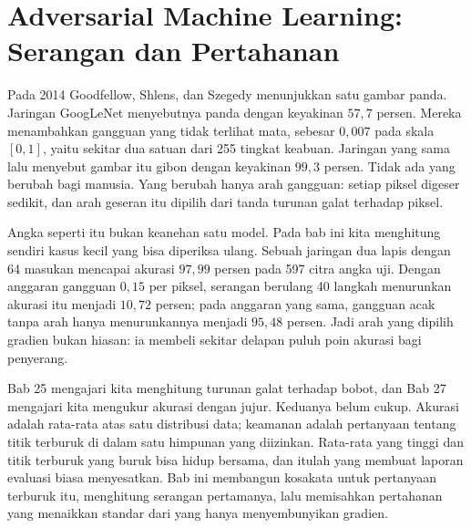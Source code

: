 \chapter[Adversarial Machine Learning]{Adversarial Machine Learning: Serangan dan Pertahanan}

Pada 2014 Goodfellow, Shlens, dan Szegedy menunjukkan satu gambar panda. Jaringan
GoogLeNet menyebutnya panda dengan keyakinan $57{,}7$ persen. Mereka menambahkan
gangguan yang tidak terlihat mata, sebesar $0{,}007$ pada skala $[0,1]$, yaitu sekitar
dua satuan dari 255 tingkat keabuan. Jaringan yang sama lalu menyebut gambar itu gibon
dengan keyakinan $99{,}3$ persen. Tidak ada yang berubah bagi manusia. Yang berubah
hanya arah gangguan: setiap piksel digeser sedikit, dan arah geseran itu dipilih dari
tanda turunan galat terhadap piksel.

Angka seperti itu bukan keanehan satu model. Pada bab ini kita menghitung sendiri
kasus kecil yang bisa diperiksa ulang. Sebuah jaringan dua lapis dengan 64 masukan
mencapai akurasi $97{,}99$ persen pada 597 citra angka uji. Dengan anggaran gangguan
$0{,}15$ per piksel, serangan berulang 40 langkah menurunkan akurasi itu menjadi
$10{,}72$ persen; pada anggaran yang sama, gangguan acak tanpa arah hanya
menurunkannya menjadi $95{,}48$ persen. Jadi arah yang dipilih gradien bukan hiasan:
ia membeli sekitar delapan puluh poin akurasi bagi penyerang.

Bab 25 mengajari kita menghitung turunan galat terhadap bobot, dan Bab 27 mengajari
kita mengukur akurasi dengan jujur. Keduanya belum cukup. Akurasi adalah rata-rata
atas satu distribusi data; keamanan adalah pertanyaan tentang titik terburuk di dalam
satu himpunan yang diizinkan. Rata-rata yang tinggi dan titik terburuk yang buruk bisa
hidup bersama, dan itulah yang membuat laporan evaluasi biasa menyesatkan. Bab ini
membangun kosakata untuk pertanyaan terburuk itu, menghitung serangan pertamanya, lalu
memisahkan pertahanan yang menaikkan standar dari yang hanya menyembunyikan gradien.

